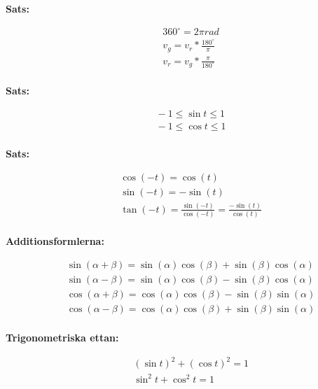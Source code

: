 \newpage

\textbf{Sats:}\par
\begin{align*}
  &\quad 360^\circ = 2\pi rad \\
  &\quad v_{g} = v_{r} * \frac{180^\circ}{\pi} \\
  &\quad v_{r} = v_{g} * \frac{\pi}{180^\circ} \\
\end{align*}

\textbf{Sats:}\par
\begin{align*}
  &\quad -1 \leq \sin{t} \leq 1 \\
  &\quad -1 \leq \cos{t} \leq 1 \\
\end{align*}

\textbf{Sats:}\par
\begin{align*}
  &\quad \cos{(-t)} = \cos{(t)} \\
  &\quad \sin{(-t)} = -\sin{(t)} \\
  &\quad \tan{(-t)} = \frac{\sin{(-t)}}{\cos{(-t)}} = \frac{-\sin{(t)}}{\cos{(t)}} \\
\end{align*}

\textbf{Additionsformlerna:}\par
\begin{align*}
  &\quad \sin{(\alpha + \beta)} = \sin{(\alpha)}\cos{(\beta)} + \sin{(\beta)}\cos{(\alpha)} \\
  &\quad \sin{(\alpha - \beta)} = \sin{(\alpha)}\cos{(\beta)} - \sin{(\beta)}\cos{(\alpha)} \\
  &\quad \cos{(\alpha + \beta)} = \cos{(\alpha)}\cos{(\beta)} - \sin{(\beta)}\sin{(\alpha)} \\
  &\quad \cos{(\alpha - \beta)} = \cos{(\alpha)}\cos{(\beta)} + \sin{(\beta)}\sin{(\alpha)} \\ 
\end{align*}

\textbf{Trigonometriska ettan:}\par
\begin{align*}
  &\quad (\sin{t})^{2} + (\cos{t})^{2} = 1 \\
  &\quad \sin^{2}{t} + \cos^{2}{t} = 1 \\ 
\end{align*}



